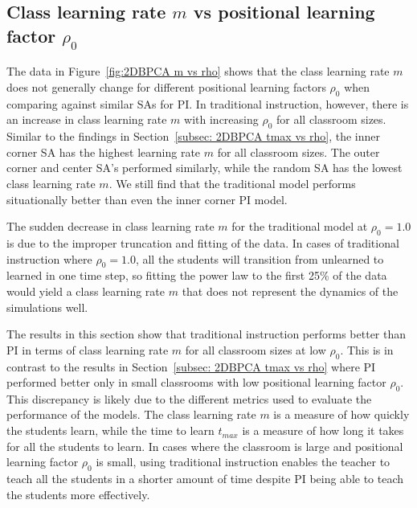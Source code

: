 \newpage

\subsection{Class learning rate $m$ vs positional learning factor $\rho_0$}

The data in Figure~\ref{fig:2DBPCA m vs rho} shows that the class learning rate $m$ does not generally change for different positional learning factors $\rho_0$ when comparing against similar SAs for PI. 
In traditional instruction, however, there is an increase in class learning rate $m$ with increasing $\rho_0$ for all classroom sizes. 
Similar to the findings in Section~\ref{subsec: 2DBPCA tmax vs rho}, the inner corner SA has the highest learning rate $m$ for all classroom sizes. 
The outer corner and center SA's performed similarly, while the random SA has the lowest class learning rate $m$. We still find that the traditional model performs situationally better than even the inner corner PI model. 

The sudden decrease in class learning rate $m$ for the traditional model at $\rho_0 = 1.0$ is due to the improper truncation and fitting of the data. 
In cases of traditional instruction where $\rho_0 = 1.0$, all the students will transition from unlearned to learned in one time step, so fitting the power law to the first 25\% of the data would yield a class learning rate $m$ that does not represent the dynamics of the simulations well.

The results in this section show that traditional instruction performs better than PI in terms of class learning rate $m$ for all classroom sizes at low $\rho_0$. 
This is in contrast to the results in Section~\ref{subsec: 2DBPCA tmax vs rho} where PI performed better only in small classrooms with low positional learning factor $\rho_0$. 
This discrepancy is likely due to the different metrics used to evaluate the performance of the models. The class learning rate $m$ is a measure of how quickly the students learn, while the time to learn $t_{max}$ is a measure of how long it takes for all the students to learn. 
In cases where the classroom is large and positional learning factor $\rho_0$ is small, using traditional instruction enables the teacher to teach all the students in a shorter amount of time despite PI being able to teach the students more effectively. 

